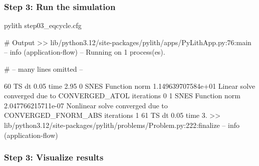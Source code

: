 \documentclass[aspectratio=169]{beamer}
\begin{document}
\begin{frame}[fragile]
  \frametitle{Step 3: Run the simulation}
  \summary{}

\begin{pyrejournal}
pylith step03_eqcycle.cfg

# Output
 >> lib/python3.12/site-packages/pylith/apps/PyLithApp.py:76:main
 -- info (application-flow)
 -- Running on 1 process(es).

# -- many lines omitted --

60 TS dt 0.05 time 2.95
    0 SNES Function norm 1.149639707584e+01
      Linear solve converged due to CONVERGED_ATOL iterations 0
    1 SNES Function norm 2.047766215711e-07
    Nonlinear solve converged due to CONVERGED_FNORM_ABS iterations 1
61 TS dt 0.05 time 3.
 >> lib/python3.12/site-packages/pylith/problems/Problem.py:222:finalize
 -- info (application-flow)
\end{pyrejournal}
  
\end{frame}


\begin{frame}
  \frametitle{Step 3: Visualize results}

    
\end{frame}


\end{document}
